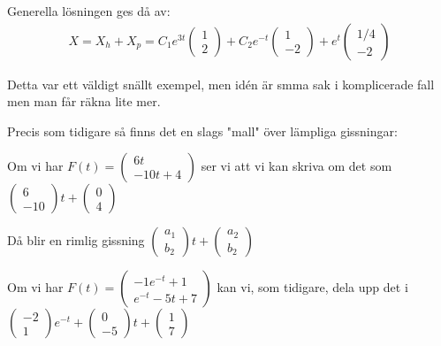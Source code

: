 \noindent Generella lösningen ges då av:
\begin{equation*}
  \begin{gathered}
    X = X_h+X_p = C_1e^{3t}\begin{pmatrix}1\\2\end{pmatrix}+C_2e^{-t}\begin{pmatrix}1\\-2\end{pmatrix}+e^t\begin{pmatrix}1/4\\-2\end{pmatrix}
  \end{gathered}
\end{equation*}
\par\bigskip
\noindent Detta var ett väldigt snällt exempel, men idén är smma sak i komplicerade fall men man får räkna lite mer.
\par\bigskip
\noindent Precis som tidigare så finns det en slags "mall" över lämpliga gissningar:
\par\bigskip
\noindent Om vi har $F(t) = \begin{pmatrix}6t\\-10t+4\end{pmatrix}$ ser vi att vi kan skriva om det som $\begin{pmatrix}6\\-10\end{pmatrix}t+\begin{pmatrix}0\\4\end{pmatrix}$\par
\noindent Då blir en rimlig gissning $\begin{pmatrix}a_1\\b_2\end{pmatrix}t+\begin{pmatrix}a_2\\b_2\end{pmatrix}$
\par\bigskip
\noindent Om vi har $F(t) = \begin{pmatrix}-1e^{-t}+1\\e^{-t}-5t+7\end{pmatrix}$ kan vi, som tidigare, dela upp det i $\begin{pmatrix}-2\\1\end{pmatrix}e^{-t}+\begin{pmatrix}0\\-5\end{pmatrix}t+\begin{pmatrix}1\\7\end{pmatrix}$\par
